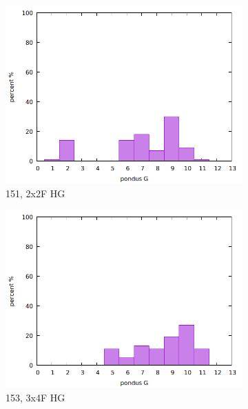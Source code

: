 \documentclass{beamer}
\begin{document}
\begin{frame}
\begin{figure}
\begin{subfigure}{.32\textwidth}
				\includegraphics[width=.99\textwidth]{../../Data/I-V/I-V_151_2021_02_05/stat.png}
				\caption{151, 2x2F HG}
			\end{subfigure}
			\begin{subfigure}{.32\textwidth}
				\includegraphics[width=.99\textwidth]{../../Data/I-V/I-V_153_2021_03_03/stat.png}
				\caption{153, 3x4F HG}
			\end{subfigure}
			\begin{subfigure}{.32\textwidth}

\end{subfigure}
\end{figure}
\end{frame}
\end{document}
